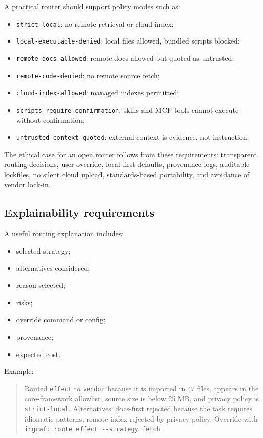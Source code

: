 \documentclass[
  11pt,
  letterpaper,
  numbers=noendperiod,
  parskip=half]{scrartcl}
\providecommand{\tightlist}{%
  \setlength{\itemsep}{0pt}\setlength{\parskip}{0pt}}
\begin{document}
A practical router should support policy modes such as:

\begin{itemize}
\tightlist
\item
  \texttt{strict-local}: no remote retrieval or cloud index;
\item
  \texttt{local-executable-denied}: local files allowed, bundled scripts
  blocked;
\item
  \texttt{remote-docs-allowed}: remote docs allowed but quoted as
  untrusted;
\item
  \texttt{remote-code-denied}: no remote source fetch;
\item
  \texttt{cloud-index-allowed}: managed indexes permitted;
\item
  \texttt{scripts-require-confirmation}: skills and MCP tools cannot
  execute without confirmation;
\item
  \texttt{untrusted-context-quoted}: external context is evidence, not
  instruction.
\end{itemize}

The ethical case for an open router follows from these requirements:
transparent routing decisions, user override, local-first defaults,
provenance logs, auditable lockfiles, no silent cloud upload,
standards-based portability, and avoidance of vendor lock-in.

\subsection{Explainability requirements}\label{sec-explainability}

A useful routing explanation includes:

\begin{itemize}
\tightlist
\item
  selected strategy;
\item
  alternatives considered;
\item
  reason selected;
\item
  risks;
\item
  override command or config;
\item
  provenance;
\item
  expected cost.
\end{itemize}

Example:

\begin{quote}
Routed \texttt{effect} to \texttt{vendor} because it is imported in 47
files, appears in the core-framework allowlist, source size is below 25
MB, and privacy policy is \texttt{strict-local}. Alternatives:
docs-first rejected because the task requires idiomatic patterns; remote
index rejected by privacy policy. Override with
\texttt{ingraft\ route\ effect\ -\/-strategy\ fetch}.
\end{quote}
\end{document}
